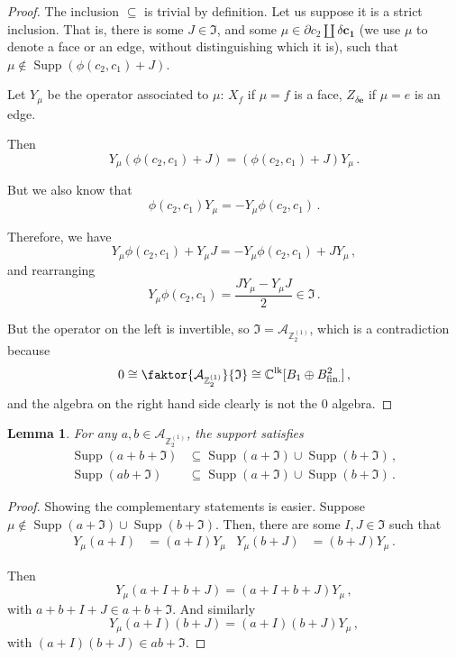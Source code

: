 \documentclass[aps,twocolumn,prx,floatfix,preprintnumbers, nofootinbib,10pt]{revtex4-2}
\numberwithin{equation}{section}
\newtheorem{lemma}[theorem]{Lemma}
\theoremstyle{definition}
\theoremstyle{remark}
\theoremstyle{claim}
\newcommand{\be}{\begin{equation}}
\newcommand{\ee}{\end{equation}}
\newcommand{\Z}{{\mathbb Z}}
\newcommand{\mc}[1]{\mathcal{#1}}
\newcommand{\paren}[1]{\left( #1 \right)}
\begin{document}
\begin{proof}
 The inclusion $\subseteq$ is trivial by definition. Let us suppose it is a strict inclusion. That is, there is some $J \in \mathfrak{I}$, and some $\mu \in \partial c_2 \coprod \delta \bm{c_1}$ (we use $\mu$ to denote a face or an edge, without distinguishing which it is), such that $\mu \notin \operatorname{Supp}(\phi(c_2, c_1) + J)$.

 Let $Y_\mu$ be the operator associated to $\mu$: $X_f$ if $\mu = f$ is a face, $Z_{\delta \bm{e}}$ if $\mu = e$ is an edge.

 Then
 \be
 Y_\mu \paren{\phi(c_2, c_1) + J} = \paren{\phi(c_2, c_1) + J} Y_\mu \,.
 \ee

 But we also know that
 \be
 \phi(c_2, c_1) Y_\mu = - Y_\mu \phi(c_2, c_1) \,.
 \ee

 Therefore, we have
 \be
 Y_\mu \phi(c_2, c_1) + Y_\mu J = -Y_\mu \phi(c_2, c_1) + J Y_\mu \,,
 \ee
 and rearranging
 \be
 Y_\mu \phi(c_2, c_1) = \frac{J Y_\mu - Y_\mu J}{2} \in \mathfrak{I} \,.
 \ee

 But the operator on the left is invertible, so $\mathfrak{I} = \mc{A}_{\Z_2^{(1)}}$, which is a contradiction because
 \be
 0 \cong \faktor{\mc{A}_{\Z_2^{(1)}}}{\mathfrak{I}} \cong \mathbb{C}^\text{lk}[B_1 \oplus B^2_\text{fin.}] \,,
 \ee
 and the algebra on the right hand side clearly is not the 0 algebra.
\end{proof}

\begin{lemma}\label{lemma:support_of_sum_and_prod}
 For any $a, b \in \mc{A}_{\Z_2^{(1)}}$, the support satisfies
 \begin{align}
  \operatorname{Supp}(a + b + \mathfrak{I}) &\subseteq \operatorname{Supp}(a + \mathfrak{I}) \cup \operatorname{Supp}(b + \mathfrak{I}) \,, \\
  \operatorname{Supp}(ab + \mathfrak{I}) &\subseteq \operatorname{Supp}(a + \mathfrak{I}) \cup \operatorname{Supp}(b + \mathfrak{I}) \,.
 \end{align}
\end{lemma}

\begin{proof}
 Showing the complementary statements is easier. Suppose $\mu \notin \operatorname{Supp}(a + \mathfrak{I}) \cup \operatorname{Supp}(b + \mathfrak{I})$. Then, there are some $I, J \in \mathfrak{I}$ such that
 \begin{align}
  Y_\mu (a + I) &= (a + I) Y_\mu & Y_\mu (b + J) &= (b + J) Y_\mu \,.
 \end{align}

 Then
 \be
 Y_\mu (a + I + b + J) = (a + I + b + J) Y_\mu \,,
 \ee
 with $a + b + I + J \in a + b + \mathfrak{I}$. And similarly
 \be
 Y_\mu (a + I) (b + J) = (a + I) (b + J) Y_\mu \,,
 \ee
 with $(a + I)(b + J) \in ab + \mathfrak{I}$.
\end{proof}
\end{document}
